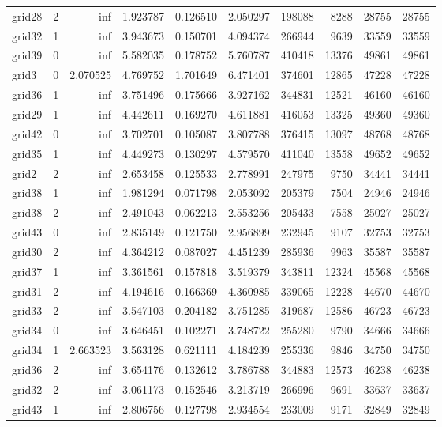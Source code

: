 \begin{longtable}{|l|r|r|r|r|r|r|r|r|r|}
grid28 & 2 & inf & 1.923787 & 0.126510 & 2.050297 & 198088 & 8288 & 28755 & 28755 \\
grid32 & 1 & inf & 3.943673 & 0.150701 & 4.094374 & 266944 & 9639 & 33559 & 33559 \\
grid39 & 0 & inf & 5.582035 & 0.178752 & 5.760787 & 410418 & 13376 & 49861 & 49861 \\
grid3 & 0 & 2.070525 & 4.769752 & 1.701649 & 6.471401 & 374601 & 12865 & 47228 & 47228 \\
grid36 & 1 & inf & 3.751496 & 0.175666 & 3.927162 & 344831 & 12521 & 46160 & 46160 \\
grid29 & 1 & inf & 4.442611 & 0.169270 & 4.611881 & 416053 & 13325 & 49360 & 49360 \\
grid42 & 0 & inf & 3.702701 & 0.105087 & 3.807788 & 376415 & 13097 & 48768 & 48768 \\
grid35 & 1 & inf & 4.449273 & 0.130297 & 4.579570 & 411040 & 13558 & 49652 & 49652 \\
grid2 & 2 & inf & 2.653458 & 0.125533 & 2.778991 & 247975 & 9750 & 34441 & 34441 \\
grid38 & 1 & inf & 1.981294 & 0.071798 & 2.053092 & 205379 & 7504 & 24946 & 24946 \\
grid38 & 2 & inf & 2.491043 & 0.062213 & 2.553256 & 205433 & 7558 & 25027 & 25027 \\
grid43 & 0 & inf & 2.835149 & 0.121750 & 2.956899 & 232945 & 9107 & 32753 & 32753 \\
grid30 & 2 & inf & 4.364212 & 0.087027 & 4.451239 & 285936 & 9963 & 35587 & 35587 \\
grid37 & 1 & inf & 3.361561 & 0.157818 & 3.519379 & 343811 & 12324 & 45568 & 45568 \\
grid31 & 2 & inf & 4.194616 & 0.166369 & 4.360985 & 339065 & 12228 & 44670 & 44670 \\
grid33 & 2 & inf & 3.547103 & 0.204182 & 3.751285 & 319687 & 12586 & 46723 & 46723 \\
grid34 & 0 & inf & 3.646451 & 0.102271 & 3.748722 & 255280 & 9790 & 34666 & 34666 \\
grid34 & 1 & 2.663523 & 3.563128 & 0.621111 & 4.184239 & 255336 & 9846 & 34750 & 34750 \\
grid36 & 2 & inf & 3.654176 & 0.132612 & 3.786788 & 344883 & 12573 & 46238 & 46238 \\
grid32 & 2 & inf & 3.061173 & 0.152546 & 3.213719 & 266996 & 9691 & 33637 & 33637 \\
grid43 & 1 & inf & 2.806756 & 0.127798 & 2.934554 & 233009 & 9171 & 32849 & 32849 \\

\end{longtable}
